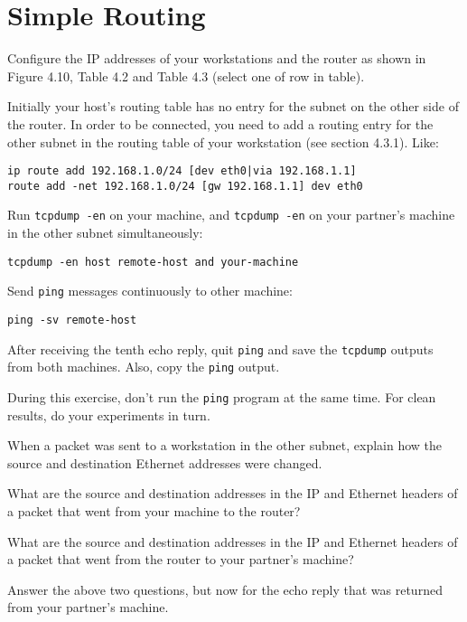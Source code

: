 \documentclass{../UTNetLab}
\begin{document}
\section{Simple Routing}
    Configure the IP addresses of your workstations and the router as shown in Figure 4.10, Table 4.2 and Table 4.3 (select one of row in table).

    Initially your host’s routing table has no entry for the subnet on the other side of the router.
    In order to be connected, you need to add a routing entry for the other subnet in the routing table of your workstation (see section 4.3.1).
    Like:
    \begin{lstlisting}
ip route add 192.168.1.0/24 [dev eth0|via 192.168.1.1]
route add -net 192.168.1.0/24 [gw 192.168.1.1] dev eth0
    \end{lstlisting}

    Run \lstinline{tcpdump -en} on your machine, and \lstinline{tcpdump -en} on your partner’s machine in the other subnet simultaneously:
    \begin{lstlisting}[emph={your-host, remote-host}]
tcpdump -en host remote-host and your-machine
    \end{lstlisting}
    Send \lstinline{ping} messages continuously to other machine:
    \begin{lstlisting}[emph={your-host, remote-host}]
ping -sv remote-host
    \end{lstlisting}
    After receiving the tenth echo reply, quit \lstinline{ping} and save the \lstinline{tcpdump} outputs from both machines.
    Also, copy the \lstinline{ping} output.

    During this exercise, don’t run the \lstinline{ping} program at the same time.
    For clean results, do your experiments in turn.
    
    \begin{report}
    \item When a packet was sent to a workstation in the other subnet, explain how the source and destination Ethernet addresses were changed.
    
    \item What are the source and destination addresses in the IP and Ethernet headers of a packet that went from your machine to the router?
    
    \item What are the source and destination addresses in the IP and Ethernet headers of a packet that went from the router to your partner’s machine?
    
    \item Answer the above two questions, but now for the echo reply that was returned from your partner’s machine.
    \end{report}
    
\end{document}
